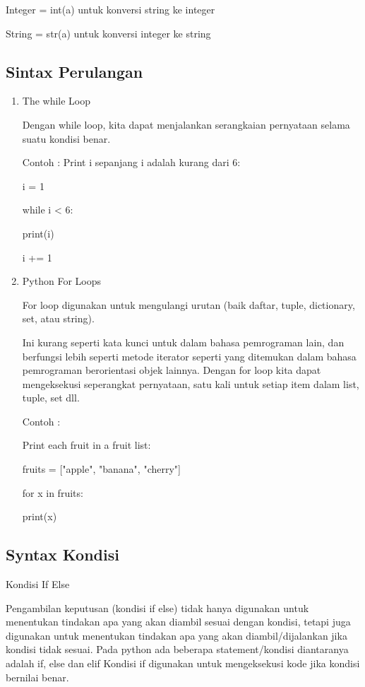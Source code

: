 Integer = int(a) untuk konversi string ke integer

String = str(a) untuk konversi integer ke string

\subsection{Sintax Perulangan}
\begin{enumerate}
\item The while Loop

Dengan while loop, kita dapat menjalankan serangkaian pernyataan selama suatu kondisi benar.

Contoh : 
Print i sepanjang i adalah kurang dari 6:

i = 1

while i < 6:

  print(i)
  
  i += 1

\item Python For Loops

For loop digunakan untuk mengulangi urutan (baik daftar, tuple, dictionary,  set, atau string).

Ini kurang seperti kata kunci untuk dalam bahasa pemrograman lain, dan berfungsi lebih seperti metode iterator seperti yang ditemukan dalam bahasa pemrograman berorientasi objek lainnya.
Dengan for loop kita dapat mengeksekusi seperangkat pernyataan, satu kali untuk setiap item dalam list, tuple, set dll.

Contoh :

Print each fruit in a fruit list:

fruits = ["apple", "banana", "cherry"]

for x in fruits:

  print(x)

\end{enumerate}

\subsection{Syntax Kondisi}

Kondisi If Else

Pengambilan keputusan (kondisi if else) tidak hanya digunakan untuk menentukan tindakan apa yang akan diambil sesuai dengan kondisi, tetapi juga digunakan untuk menentukan tindakan apa yang akan diambil/dijalankan jika kondisi tidak sesuai.
Pada python ada beberapa statement/kondisi diantaranya adalah if, else dan elif Kondisi if digunakan untuk mengeksekusi kode jika kondisi bernilai benar.

